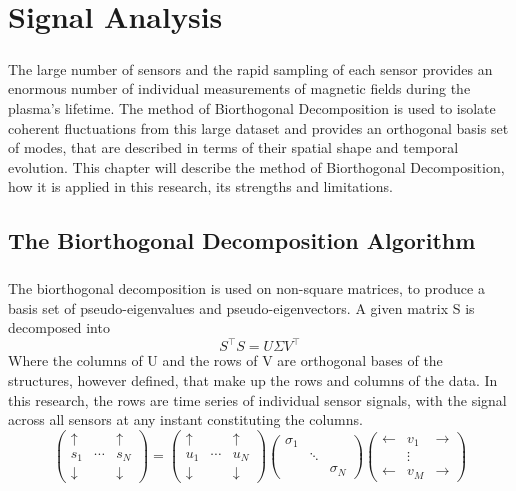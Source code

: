 \chapter{Signal Analysis}
\paragraph{}  The large number of sensors and the rapid sampling of each sensor provides an enormous number of individual measurements of magnetic fields during the plasma's lifetime. The method of Biorthogonal Decomposition is used to isolate coherent fluctuations from this large dataset and provides an orthogonal basis set of modes, that are described in terms of their spatial shape and temporal evolution.  This chapter will describe the method of Biorthogonal Decomposition, how it is applied in this research, its strengths and limitations.

\section{The Biorthogonal Decomposition Algorithm}
\paragraph{}
The biorthogonal decomposition is used on non-square matrices, to produce a basis set of pseudo-eigenvalues and pseudo-eigenvectors.  A given matrix S is decomposed into 
\begin{equation}
S^{\intercal} S = U \Sigma V^{\intercal}
\end{equation}
Where the columns of U and the rows of V are orthogonal bases of the structures, however defined, that make up the rows and columns of the data. In this research, the rows are time series of individual sensor signals, with the signal across all sensors at any instant constituting the columns.  
$$
\begin{pmatrix}
\uparrow& &\uparrow\\
s_1&\cdots&s_N\\
\downarrow & &\downarrow
\end{pmatrix}
 =
\begin{pmatrix}
\uparrow& &\uparrow\\
u_1&\cdots&u_N\\
\downarrow & &\downarrow
\end{pmatrix}
\begin{pmatrix}
\sigma_1& &\\
&\ddots&\\
& &\sigma_N
\end{pmatrix}
\begin{pmatrix}
\leftarrow& v_1&\rightarrow\\
&\vdots&\\
\leftarrow& v_M &\rightarrow
\end{pmatrix}
$$




